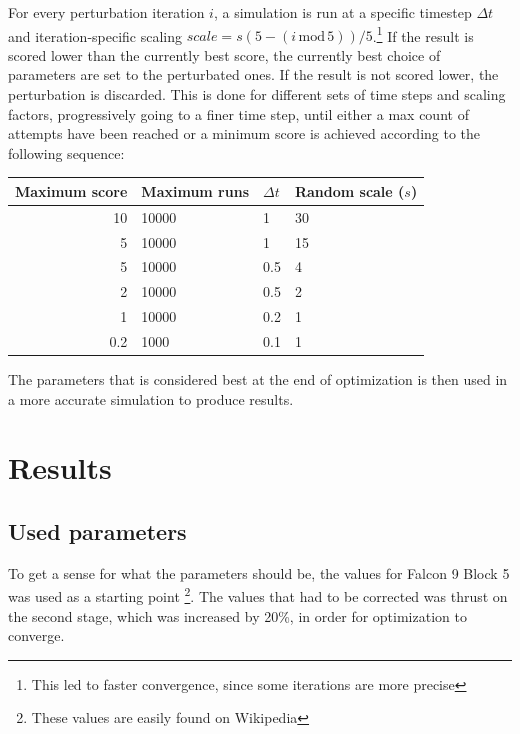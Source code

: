 \documentclass[11pt]{article}
\begin{document}
For every perturbation iteration $i$, a simulation is run at a specific timestep $\Delta t$ and iteration-specific scaling 
$ scale = s (5 - (i\,\text{mod}\,5)) / 5$.\footnote{This led to faster convergence, since some iterations are more precise} If the result is scored lower than the currently best score, the currently best choice of parameters are set to
the perturbated ones.
If the result is not scored lower, the perturbation is discarded.
This is done for different sets of time steps and scaling factors, progressively going to a finer time step, until either a max count of attempts have been reached or a minimum score is achieved according to the following sequence:
\begin{center}
  \begin{tabular}{ r | l | l | l  }
    Maximum score & Maximum runs & $\Delta t$ & Random scale ($s$) \\
    \hline
    10 & 10000 & 1 & 30 \\
    5 & 10000 & 1 & 15 \\
    5 & 10000 & 0.5 & 4 \\
    2 & 10000 & 0.5 & 2 \\
    1 & 10000 & 0.2 & 1 \\
    0.2 & 1000 & 0.1 & 1 \\
  \end{tabular}
\end{center}

The parameters that is considered best at the end of optimization is then used in a more accurate simulation to produce results.

\section{Results}
\subsection{Used parameters}
To get a sense for what the parameters should be, the values for Falcon 9 Block 5 was used as a starting point
\footnote{These values are easily found on Wikipedia}. The values that had to be corrected was thrust on the second stage, which was increased by 20\%, in order for optimization to converge.
\end{document}
